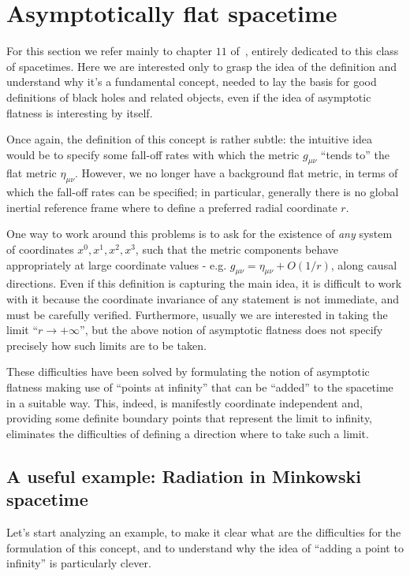 \section{Asymptotically flat spacetime}
For this section we refer mainly to chapter \(11\) of~\cite{wald1991general}, entirely dedicated to this class of spacetimes.
Here we are interested only to grasp the idea of the definition and understand why it's a fundamental concept, needed to lay the basis for good definitions of black holes and related objects, even if the idea of asymptotic flatness is interesting by itself.

Once again, the definition of this concept is rather subtle: the intuitive idea would be to specify some fall-off rates with which the metric \(g_{\mu\nu}\) ``tends to'' the flat metric  \(\eta_{\mu\nu}\). However, we no longer have a background flat metric, in terms of which the fall-off rates can be specified; in particular, generally there is no global inertial reference frame where to define a preferred radial coordinate \(r\).

One way to work around this problems is to ask for the existence of \emph{any} system of coordinates \(x^0, x^1, x^2, x^3\), such that the metric components behave appropriately at large coordinate values - e.g. \(g_{\mu\nu} = \eta_{\mu\nu} + O(1/r)\), along causal directions.
Even if this definition  is capturing the main idea, it is difficult to work with it because the coordinate invariance of any statement is not immediate, and must be carefully verified.
Furthermore, usually we are interested in taking the limit ``\(r \rightarrow +\infty\)'', but the above notion of asymptotic flatness does not specify precisely how such limits are to be taken.

These difficulties have been solved by formulating the notion of asymptotic flatness making use of ``points at infinity'' that can be ``added'' to the spacetime in a suitable way. This, indeed, is manifestly coordinate independent and, providing some definite boundary points that represent the limit to infinity, eliminates the difficulties of defining a direction where to take such a limit.

\subsection{A useful example: Radiation in Minkowski spacetime}
Let's start analyzing an example, to make it clear what are the difficulties for the formulation of this concept, and to understand why the idea of ``adding a point to infinity'' is particularly clever.

